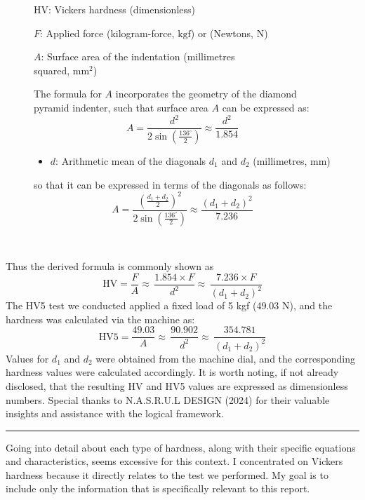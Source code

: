 \documentclass{article}
\newcommand{\wm}[1]{%
    \begin{minipage}{1\textwidth}
        #1
    \end{minipage}%
}
\begin{document}
\begin{figure}[H]
\begin{minipage}{0.51\textwidth}
\begin{itemize}[itemsep=-1mm]
                \item HV: Vickers hardness (dimensionless)
                \item \(F\): Applied force (kilogram-force, \(\text{kgf}\)) or (Newtons, \(\text{N}\))
                \wm{\item \(A\): Surface area of the indentation (millimetres \\squared, \(\text{mm}^2\))}            
            \end{itemize}
            The formula for $A$ incorporates the geometry of the diamond pyramid indenter, such that surface area \(A\) can be expressed as:
            \begin{equation}
                A = \frac{d^2}{2\sin\left(\frac{136^\circ}{2}\right)} \approx \frac{d^2}{1.854} 
            \end{equation}
            \begin{itemize}[itemsep=-1mm]
                \item \( d \): Arithmetic mean of the diagonals \( d_1 \) and \( d_2 \) (millimetres, \(\text{mm}\))
            \end{itemize}
            so that it can be expressed in terms of the diagonals as follows:
            \begin{equation}
                A= \frac{\left(\frac{d_1+d_2}{2}\right)^2}{2\sin\left(\frac{136^\circ}{2}\right)} \approx \frac{\left(d_1 + d_2\right)^2}{7.236}
            \end{equation}
        \end{minipage}\\
    \end{figure}
    \vspace{-1em}\newpage\noindent
    Thus the derived formula is commonly shown as
    \begin{equation}
        {\text{HV} = \frac{F}{A} \approx \, \frac{1.854 \times F}{d^2} \approx \, \frac{7.236\times F}{\left(d_1 + d_2\right)^2}}    
    \end{equation} 
    The HV5 test we conducted applied a fixed load of 5 kgf (49.03 N), and the hardness was calculated via the machine as:  
    \begin{equation}
        \text{HV5} = \frac{49.03}{A} \approx \, \frac{90.902}{d^2} \approx \, \frac{354.781}{\left(d_1 + d_2\right)^2}
    \end{equation}
    Values for \(d_1\) and \(d_2\) were obtained from the machine dial, and the corresponding hardness values were calculated accordingly. It is worth noting, if not already disclosed, that the resulting HV and HV5 values are expressed as dimensionless numbers. Special thanks to N.A.S.R.U.L DESIGN (2024) for their valuable insights and assistance with the logical framework.\\[1em]
    \hrule\vspace{1em}
    Going into detail about each type of hardness, along with their specific equations and characteristics, seems excessive for this context. I concentrated on Vickers hardness because it directly relates to the test we performed. My goal is to include only the information that is specifically relevant to this report.
    
\end{document}
